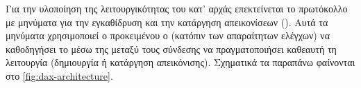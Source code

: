 
Για την υλοποίηση της λειτουργικότητας του  κατ' αρχάς
επεκτείνεται το  πρωτόκολλο με μηνύματα για την εγκαθίδρυση και την
κατάργηση απεικονίσεων (). Αυτά τα μηνύματα χρησιμοποιεί ο \guest{}
προκειμένου ο  (κατόπιν των απαραίτητων ελέγχων) να καθοδηγήσει το
\qemu{} μέσω της μεταξύ τους σύνδεσης να πραγματοποιήσει καθεαυτή τη λειτουργία
(δημιουργία ή κατάργηση απεικόνισης). Σχηματικά τα παραπάνω φαίνονται
στο \ref{fig:dax-architecture}.
